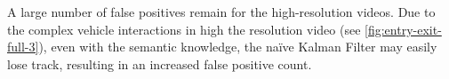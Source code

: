 A large number of false positives remain for the high-resolution videos. Due to the complex vehicle interactions in high the resolution video (see \ref{fig:entry-exit-full-3}), even with the semantic knowledge, the na\"ive Kalman Filter may easily lose track, resulting in an increased false positive count.



